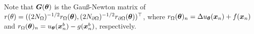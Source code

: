 
Note that ${\bm{G}}({\bm{\theta}})$ is the Gauß-Newton matrix of $r(\theta) = ((2N_\Omega)^{-1/2}r_\Omega({\bm{\theta}}), (2N_{\partial\Omega})^{-1/2} r_{\partial\Omega}({\bm{\theta}}))^\top$, 
where $r_{\Omega}({\bm{\theta}})_n = \Delta u_{\bm{\theta}}({\bm{x}}_n) + f({\bm{x}}_n)$ and $r_{\Omega}({\bm{\theta}})_n = u_{\bm{\theta}}({\bm{x}}_n^b) - g({\bm{x}}_n^b)$, respectively. 

